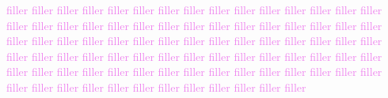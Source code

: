 \textcolor{violet}{filler filler filler filler filler filler filler filler filler filler filler filler filler filler filler filler filler filler filler filler filler filler filler filler filler filler filler filler filler filler filler filler filler filler filler filler filler filler filler filler filler filler filler filler filler filler filler filler filler filler filler filler filler filler filler filler filler filler filler filler filler filler filler filler filler filler filler filler filler filler filler filler filler filler filler filler filler filler filler filler filler filler filler filler filler filler filler}
